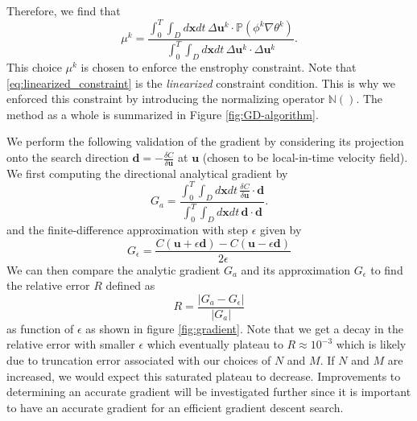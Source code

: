 Therefore, we find that 
\begin{equation}
\mu^{k} =\frac{ \int_0^T\int_{D}d\mathbf{x}dt \, \Delta \mathbf{u}^k  \cdot \mathds{P}(\phi^k \nabla\theta^k)}{ \int_0^T\int_{D}d\mathbf{x}dt \, \Delta \mathbf{u}^k  \cdot \Delta \mathbf{u}^k }.
\end{equation}
This choice $\mu^{k}$ is chosen to enforce the enstrophy constraint. Note that \eqref{eq:linearized_constraint} is the {\it linearized} constraint condition. This is why we enforced this constraint by introducing the normalizing operator $\mathds{N}()$. The method as a whole is summarized in Figure \ref{fig:GD-algorithm}.  

We perform the following validation of the gradient by considering its projection onto the search direction $\mathbf{d} = - \frac{\delta C}{\delta \mathbf{u}}$ at $\mathbf{u}$ (chosen to be local-in-time velocity field).  We first computing the directional analytical gradient by 
\begin{equation}
G_{a} =\frac{ \int_0^T\int_{D}d\mathbf{x}dt \, \frac{\delta C}{\delta \mathbf{u}} \cdot \mathbf{d} }{ \int_0^T\int_{D}d\mathbf{x}dt \,  \mathbf{d}\cdot \mathbf{d} }.
\end{equation} 
and the finite-difference approximation with step $\epsilon$ given by 
\begin{equation}
G_{\epsilon} = \frac{C(\mathbf{u} + \epsilon\mathbf{d})- C(\mathbf{u} - \epsilon\mathbf{d})}{2\epsilon}
\end{equation} 
We can then compare the analytic gradient $G_{a}$ and its approximation $G_{\epsilon}$ to find the relative error $R$ defined as 
\begin{equation}
R = \frac{|G_{a}-G_{\epsilon}|}{|G_{a}|} 
\end{equation}
as function of $\epsilon$ as shown in figure \ref{fig:gradient}. Note that we get a decay in the relative error with smaller $\epsilon$ which eventually plateau to $R \approx 10^{-3}$ which is likely due to truncation error associated with our choices of $N$ and $M$. If $N$ and $M$ are increased, we would expect this saturated plateau to decrease. Improvements to determining an accurate gradient will be investigated further since it is important to have an accurate gradient for an efficient gradient descent search.



